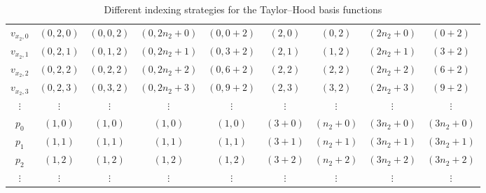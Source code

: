 \documentclass[a4paper,10pt,headings=normal,bibliography=totoc]{scrartcl}
\begin{document}
\begin{table}
\begin{center}
\begin{tabular}{c|c|c|c|c|c|c|c|c}
  \\
  $v_{x_2,0}$
    & $(0,2,0)$
    & $(0,0,2)$
    & $(0,2n_2+0)$
    & $(0,0+2)$
    & $(2,0)$
    & $(0,2)$
    & $(2n_2+0)$
    & $(0+2)$
    \\
  $v_{x_2,1}$
    & $(0,2,1)$
    & $(0,1,2)$
    & $(0,2n_2+1)$
    & $(0,3+2)$
    & $(2,1)$
    & $(1,2)$
    & $(2n_2+1)$
    & $(3+2)$
    \\
  $v_{x_2,2}$
    & $(0,2,2)$
    & $(0,2,2)$
    & $(0,2n_2+2)$
    & $(0,6+2)$
    & $(2,2)$
    & $(2,2)$
    & $(2n_2+2)$
    & $(6+2)$
    \\
  $v_{x_2,3}$
    & $(0,2,3)$
    & $(0,3,2)$
    & $(0,2n_2+3)$
    & $(0,9+2)$
    & $(2,3)$
    & $(3,2)$
    & $(2n_2+3)$
    & $(9+2)$
    \\
  $\vdots$ & $\vdots$ & $\vdots$ & $\vdots$ &  $\vdots$ & $\vdots$ & $\vdots$ & $\vdots$ & $\vdots$
  \\
  $p_{0}$
    & $(1,0)$
    & $(1,0)$
    & $(1,0)$
    & $(1,0)$
    & $(3+0)$
    & $(n_2+0)$
    & $(3n_2+0)$
    & $(3n_2+0)$
    \\
  $p_{1}$
    & $(1,1)$
    & $(1,1)$
    & $(1,1)$
    & $(1,1)$
    & $(3+1)$
    & $(n_2+1)$
    & $(3n_2+1)$
    & $(3n_2+1)$
    \\
  $p_{2}$
    & $(1,2)$
    & $(1,2)$
    & $(1,2)$
    & $(1,2)$
    & $(3+2)$
    & $(n_2+2)$
    & $(3n_2+2)$
    & $(3n_2+2)$
    \\
  $\vdots$ & $\vdots$ & $\vdots$ & $\vdots$ &  $\vdots$ & $\vdots$ & $\vdots$ & $\vdots$ & $\vdots$
  \\
  \hline
\end{tabular}
\end{center}
\caption{Different indexing strategies for the Taylor--Hood basis functions}
\label{tab:th_indexing_variants}
\end{table}
\end{document}

